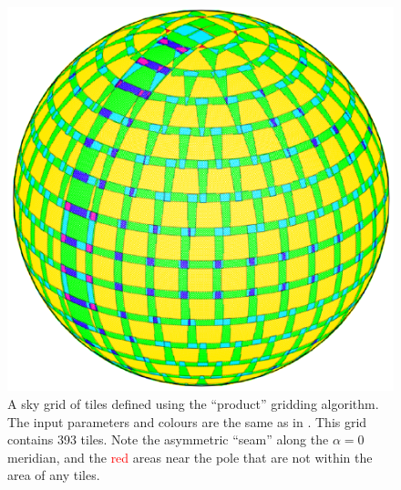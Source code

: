 \begin{colsection}
\begin{colsection}
\begin{figure}[p]
    \begin{minipage}[c]{0.50\textwidth}
        \caption[The ``cosine'' gridding algorithm]{
            A sky grid of tiles defined using the ``product'' gridding algorithm. The input parameters and colours are the same as in . This grid contains 393 tiles. Note the asymmetric ``seam'' along the $\alpha=0$ meridian, and the \textcolor{red}{red} areas near the pole that are not within the area of any tiles.
        }\label{fig:cosine}
    \end{minipage}
    \hfill
    \begin{minipage}[c]{0.46\textwidth}
        \includegraphics[width=\linewidth]{images/algo_cosine.pdf}
    \end{minipage}
\end{figure}


\end{colsection}
\end{colsection}
